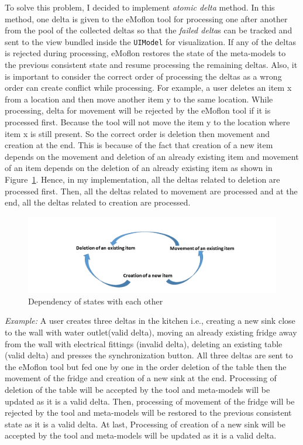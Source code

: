 To solve this problem, I decided to implement \textit{atomic delta} method. In this method, one delta is given to the eMoflon tool for processing one after another from the pool of the collected deltas so that the \textit{failed delta}s can be tracked and sent to the view bundled inside the \texttt{UIModel} for visualization. If any of the deltas is rejected during processing, eMoflon restores the state of the meta-models to the previous consistent state and resume processing the remaining deltas. Also, it is important to consider the correct order of processing the deltas as a wrong order can create conflict while processing. For example, a user deletes an item x from a location and then move another item y to the same location. While processing, delta for movement will be rejected by the eMoflon tool if it is processed first. Because the tool will not move the item y to the location where item x is still present. So the correct order is deletion then movement and creation at the end. This is because of the fact that creation of a new item depends on the movement and deletion of an already existing item and movement of an item depends on the deletion of an already existing item as shown in Figure~\ref{fig:State_Dependency}. Hence, in my implementation, all the deltas related to deletion are processed first. Then, all the deltas related to movement are processed and at the end, all the deltas related to creation are processed.  

\begin{figure}
	\includegraphics[width=1\textwidth]{figures/State_Dependency}
	\caption{Dependency of states with each other}
	\label{fig:State_Dependency}
\end{figure}

\textit{Example:} A user creates three deltas in the kitchen i.e., creating a new sink close to the wall with water outlet(valid delta), moving an already existing fridge away from the wall with electrical fittings (invalid delta), deleting an existing table (valid delta) and presses the synchronization button. All three deltas are sent to the eMoflon tool but fed one by one in the order deletion of the table then the movement of the fridge and creation of a new sink at the end. Processing of deletion of the table will be accepted by the tool and meta-models will be updated as it is a valid delta. Then, processing of movement of the fridge will be rejected by the tool and meta-models will be restored to the previous consistent state as it is a valid delta. At last, Processing of creation of a new sink will be accepted by the tool and meta-models will be updated as it is a valid delta.

